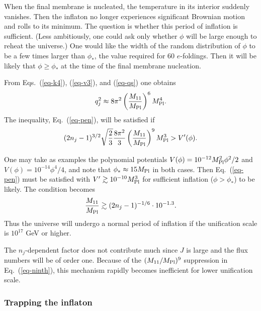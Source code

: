 \documentclass[12pt]{article}
\begin{document}
When the final membrane is nucleated, the temperature in its interior
suddenly vanishes.  Then the inflaton no longer experiences
significant Brown\-ian motion and rolls to its minimum.  The question
is whether this period of inflation is sufficient.  (Less ambitiously,
one could ask only whether $\phi$ will be large enough to reheat the
universe.)  One would like the width of the random distribution of
$\phi$ to be a few times larger than $\phi_*$, the value required for
60 $e$-foldings.  Then it will be likely that $\phi \geq \phi_*$ at
the time of the final membrane nucleation.

From Eqs.~(\ref{eq-k4}), (\ref{eq-v3}), and (\ref{eq-qs}) one obtains
\begin{equation}
q_j^2 \approx 8 \pi^2 \left( \frac{M_{11}}{M_{\rm Pl}} \right)^6
M_{\rm Pl}^4.
\end{equation}
The inequality, Eq.~(\ref{eq-pen}), will be satisfied if
\begin{equation}
(2 n_j -1)^{3/2} \sqrt{\frac{2}{3}} \frac{8\pi^2}{3} \left(
\frac{M_{11}}{M_{\rm Pl}} \right)^9 M_{\rm Pl}^3 > V'(\phi).
\label{eq-ninth}
\end{equation}

One may take as examples the polynomial potentials $V(\phi) = 10^{-12}
M_{\rm Pl}^2 \phi^2/2$ and $V(\phi) = 10^{-14} \phi^4/4$, and note
that $\phi_* \approx 15 M_{\rm Pl}$ in both cases.  Then
Eq.~(\ref{eq-pen}) must be satisfied with $V' \gtrsim 10^{-10} M_{\rm
Pl}^3$ for sufficient inflation ($\phi>\phi_*$) to be likely.  The
condition becomes
\begin{equation}
\frac{M_{11}}{M_{\rm Pl}} \gtrsim (2 n_j - 1)^{-1/6} \cdot 10^{-1.3}.
\end{equation}
Thus the universe will undergo a normal period of inflation if the
unification scale is $10^{17}$ GeV or higher.

The $n_j$-dependent factor does not contribute much since $J$ is large
and the flux numbers will be of order one.  Because of the $ (
M_{11}/M_{\rm Pl} )^9$ suppression in Eq.~(\ref{eq-ninth}), this
mechanism rapidly becomes inefficient for lower unification scale.


\subsubsection{Trapping the inflaton}
\end{document}
